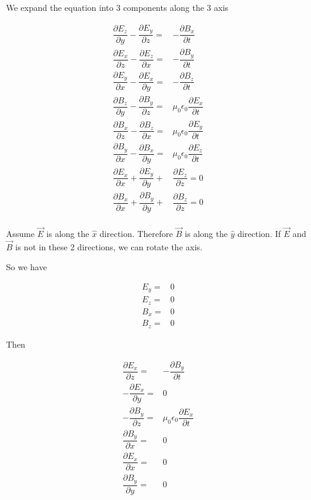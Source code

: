 \documentclass{article}
\begin{document}
We expand the equation into 3 components along the 3 axis

\begin{equation*}
  \begin{aligned}
    \dfrac{\partial E_{z}}{\partial y} - \dfrac{\partial E_{y}}{\partial z} =& - \dfrac{\partial B_{x}}{\partial t} \\
    \dfrac{\partial E_{x}}{\partial z} - \dfrac{\partial E_{z}}{\partial x} =& - \dfrac{\partial B_{y}}{\partial t} \\
    \dfrac{\partial E_{y}}{\partial x} - \dfrac{\partial E_{x}}{\partial y} =& - \dfrac{\partial B_{z}}{\partial t} \\
    \dfrac{\partial B_{z}}{\partial y} - \dfrac{\partial B_{y}}{\partial z} =& \mu_0 \epsilon_0 \dfrac{\partial E_{x}}{\partial t} \\
    \dfrac{\partial B_{x}}{\partial z} - \dfrac{\partial B_{z}}{\partial x} =& \mu_0 \epsilon_0 \dfrac{\partial E_{y}}{\partial t} \\
    \dfrac{\partial B_{y}}{\partial x} - \dfrac{\partial B_{x}}{\partial y} =& \mu_0 \epsilon_0 \dfrac{\partial E_{z}}{\partial t} \\
    \dfrac{\partial E_{x}}{\partial x} + \dfrac{\partial E_{y}}{\partial y} +& \dfrac{\partial E_{z}}{\partial z} = 0 \\
    \dfrac{\partial B_{x}}{\partial x} + \dfrac{\partial B_{y}}{\partial y} +& \dfrac{\partial B_{z}}{\partial z} = 0 \\
  \end{aligned}
\end{equation*}

Assume $\vec{E}$ is along the $\hat{x}$ direction. Therefore $\vec{B}$ is along the $\hat{y}$ direction. If $\vec{E}$ and $\vec{B}$ is not in these 2 directions, we can rotate the axis.

So we have

\begin{equation*}
  \begin{aligned}
    E_y =& 0 \\
    E_z =& 0 \\
    B_x =& 0 \\
    B_z =& 0 
  \end{aligned}
\end{equation*}

Then

\begin{equation*}
  \begin{aligned}
    \dfrac{\partial E_{x}}{\partial z} =& - \dfrac{\partial B_{y}}{\partial t} \\
    - \dfrac{\partial E_{x}}{\partial y} =& 0 \\
    - \dfrac{\partial B_{y}}{\partial z} =& \mu_0 \epsilon_0 \dfrac{\partial E_{x}}{\partial t} \\
    \dfrac{\partial B_{y}}{\partial x} =& 0 \\
    \dfrac{\partial E_{x}}{\partial x} =& 0 \\
    \dfrac{\partial B_{y}}{\partial y} =& 0 \\
  \end{aligned}
\end{equation*}
\end{document}
